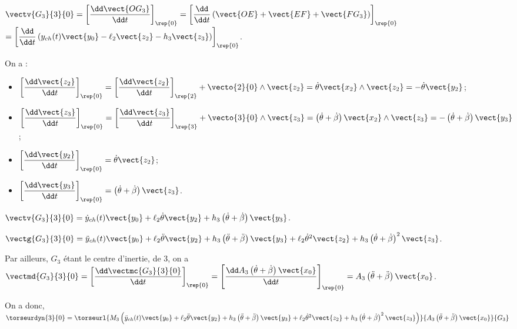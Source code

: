 \ifprof
\begin{corrige}
$\vectv{G_3}{3}{0}=   \left[\dfrac{\dd \vect{OG_3}}{\dd t}\right]_{\rep{0}}=   \left[\dfrac{\dd }{\dd t}\left(
\vect{OE}+\vect{EF}+\vect{FG_3} \right)\right]_{\rep{0}}$ 
$=   \left[\dfrac{\dd }{\dd t}\left(
y_{ch}(t) \vect{y_0}-\ell_2\vect{z_2}-h_3\vect{z_3} \right)\right]_{\rep{0}}$. 

On a : 
\begin{itemize}
\item $ \left[\dfrac{\dd \vect{z_2}}{\dd t}\right]_{\rep{0}}=\left[\dfrac{\dd \vect{z_2}}{\dd t}\right]_{\rep{2}}+\vecto{2}{0} \wedge \vect{z_2}=\dot{\theta} \vect{x_2}\wedge \vect{z_2}=-\dot{\theta} \vect{y_2}$;
\item $ \left[\dfrac{\dd \vect{z_3}}{\dd t}\right]_{\rep{0}}=\left[\dfrac{\dd \vect{z_3}}{\dd t}\right]_{\rep{3}}+\vecto{3}{0} \wedge \vect{z_3}=\left(\dot{\theta}+\dot{\beta}\right) \vect{x_2}\wedge \vect{z_3}=-\left(\dot{\theta}+\dot{\beta}\right) \vect{y_3}$;
\item $ \left[\dfrac{\dd \vect{y_2}}{\dd t}\right]_{\rep{0}}=\dot{\theta} \vect{z_2}$;
\item $ \left[\dfrac{\dd \vect{y_3}}{\dd t}\right]_{\rep{0}}=\left(\dot{\theta}+\dot{\beta}\right) \vect{z_3}$.
\end{itemize}

$\vectv{G_3}{3}{0}=   
\dot{y}_{ch}(t) \vect{y_0}+\ell_2\dot{\theta} \vect{y_2}+h_3\left(\dot{\theta}+\dot{\beta}\right) \vect{y_3}$.

$\vectg{G_3}{3}{0}=   
\ddot{y}_{ch}(t) \vect{y_0}+\ell_2\ddot{\theta} \vect{y_2}+h_3\left(\ddot{\theta}+\ddot{\beta}\right) \vect{y_3}
+   
\ell_2\dot{\theta}^2 \vect{z_2}  +h_3\left(\dot{\theta}+\dot{\beta}\right)^2\vect{z_3} $.

Par ailleurs, $G_3$ étant le centre d'inertie, de 3, on a $\vectmd{G_3}{3}{0}=\left[\dfrac{\dd \vectmc{G_3}{3}{0}}{\dd t}\right]_{\rep{0}}=\left[\dfrac{\dd A_3 \left(\dot{\theta}+\dot{\beta} \right)\vect{x_0}}{\dd t}\right]_{\rep{0}}=A_3 \left(\ddot{\theta}+\ddot{\beta} \right)\vect{x_0}$.

On a donc, $\torseurdyn{3}{0}=\torseurl{M_3\left(\ddot{y}_{ch}(t) \vect{y_0}+\ell_2\ddot{\theta} \vect{y_2}+h_3\left(\ddot{\theta}+\ddot{\beta}\right) \vect{y_3}
+   
\ell_2\dot{\theta}^2 \vect{z_2}  +h_3\left(\dot{\theta}+\dot{\beta}\right)^2\vect{z_3}\right)}{A_3 \left(\ddot{\theta}+\ddot{\beta} \right)\vect{x_0}}{G_3}$
\end{corrige}
\else
\fi





